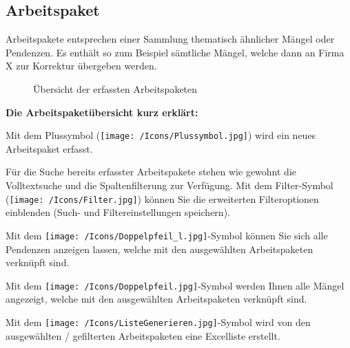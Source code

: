 \pagebreak
\subsection{Arbeitspaket}

Arbeitspakete entsprechen einer Sammlung thematisch ähnlicher Mängel oder Pendenzen. Es enthält so zum Beispiel sämtliche Mängel, welche dann an Firma X zur Korrektur übergeben werden.

\begin{figure}[H]
\caption{Übersicht der erfassten Arbeitspaketen}
\end{figure}

\textbf{Die Arbeitspaketübersicht kurz erklärt:}

\vspace{\baselineskip}

\begin{compactitem}
	\item Mit dem Plussymbol (\texttt{[image: /Icons/Plussymbol.jpg]}) wird ein neues Arbeitspaket erfasst. 
	\item Für die Suche bereits erfasster Arbeitspakete stehen wie gewohnt die Volltextsuche und die Spaltenfilterung zur Verfügung. Mit dem Filter-Symbol (\texttt{[image: /Icons/Filter.jpg]}) können Sie die erweiterten Filteroptionen einblenden (Such- und Filtereinstellungen speichern).
	\item Mit dem \texttt{[image: /Icons/Doppelpfeil\_l.jpg]}-Symbol können Sie sich alle Pendenzen anzeigen lassen, welche mit den ausgewählten Arbeitspaketen verknüpft sind.
	\item Mit dem \texttt{[image: /Icons/Doppelpfeil.jpg]}-Symbol werden Ihnen alle Mängel angezeigt, welche mit den ausgewählten Arbeitspaketen verknüpft sind.
	\item Mit dem \texttt{[image: /Icons/ListeGenerieren.jpg]}-Symbol wird von den ausgewählten / gefilterten Arbeitspaketen eine Excelliste erstellt.
\end{compactitem}

